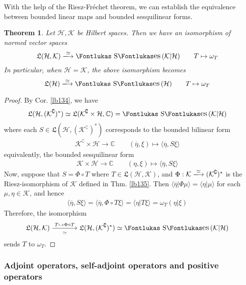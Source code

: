 \documentclass[12pt,b5paper,notitlepage]{article}
\theoremstyle{definition}
\theoremstyle{plain}
\newtheorem{thm}[df]{Theorem}
\DeclareMathOperator{\Ses}{\text{\Fontlukas S}\text{\kern -0pt {\Fontlukas\large es}}\,}
\newcommand{\fk}{\mathfrak}
\newcommand{\ovl}{\overline}
\newcommand{\bk}[1]{\langle {#1}\rangle}
\newcommand{\Co}{\complement}
\newcommand{\Cbb}{\mathbb C}
\newcommand{\MH}{\mathcal H}
\newcommand{\MK}{\mathcal K}
\numberwithin{equation}{section}
\begin{document}
With the help of the Riesz-Fr\'echet theorem, we can establish the equivalence between bounded linear maps and bounded sesquilinear forms.

\begin{thm}\label{lb136}
Let $\MH,\MK$ be Hilbert spaces. Then we have an isomorphism of normed vector spaces
\begin{gather}
\fk L(\MH,\MK)\xlongrightarrow{\simeq}\Ses(\MK|\MH)\qquad T\mapsto\omega_T
\end{gather}
In particular, when $\MH=\MK$, the above isomorphism becomes
\begin{gather}
\fk L(\MH)\xlongrightarrow{\simeq}\Ses(\MH)\qquad T\mapsto\omega_T
\end{gather}
\end{thm}


\begin{proof}
By Cor. \ref{lb134}, we have
\begin{align*}
\fk L(\MH,(\MK^\Co)^*)\simeq\fk L(\MK^\Co\times\MH,\Cbb)=\Ses(\MK|\MH)
\end{align*}
where each $S\in\fk L(\MH,(\MK^\Co)^*)$ corresponds to the bounded bilinear form
\begin{align*}
\MK^\Co\times\MH\rightarrow\Cbb\qquad (\ovl\eta,\xi)\mapsto \bk{\ovl\eta,S\xi}
\end{align*}
equivalently, the bounded sesquilinear form
\begin{align*}
\MK\times\MH\rightarrow\Cbb\qquad (\eta,\xi)\mapsto \bk{\ovl\eta,S\xi}
\end{align*}
Now, suppose that $S=\Phi\circ T$ where $T\in\fk L(\MH,\MK)$, and $\Phi:\MK\xlongrightarrow{\simeq}(\MK^\Co)^*$ is the Riesz-isomorphism of $\MK$ defined in Thm. \ref{lb135}. Then $\bk{\ovl\eta|\Phi\mu}=\bk{\eta|\mu}$ for each $\mu,\eta\in\MK$, and hence
\begin{align*}
\bk{\ovl\eta,S\xi}=\bk{\ovl\eta,\Phi\circ T\xi}=\bk{\eta|T\xi}=\omega_T(\eta|\xi)
\end{align*}
Therefore, the isomorphism
\begin{align*}
\fk L(\MH,\MK)\xlongrightarrow[\simeq]{T\mapsto\Phi\circ T}\fk L(\MH,(\MK^\Co)^*)\simeq\Ses(\MK|\MH)
\end{align*}
sends $T$ to $\omega_T$.
\end{proof}


\subsubsection{Adjoint operators, self-adjoint operators and positive operators}
\end{document}
